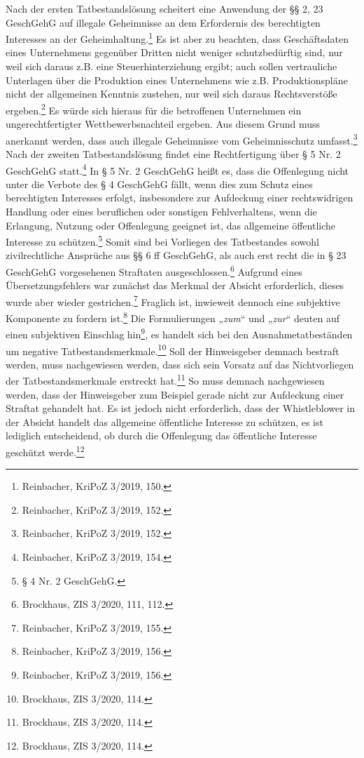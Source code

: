 Nach der ersten Tatbestandslösung scheitert eine Anwendung der §§ 2, 23 GeschGehG auf illegale Geheimnisse an dem Erfordernis des berechtigten Interesses an der Geheimhaltung.\footnote{Reinbacher, KriPoZ 3/2019, 150.}
Es ist aber zu beachten, dass Geschäftsdaten eines Unternehmens gegenüber Dritten nicht weniger schutzbedürftig sind, nur weil sich daraus z.B. eine Steuerhinterziehung ergibt; auch sollen vertrauliche Unterlagen über die Produktion eines Unternehmens wie z.B. Produktionspläne nicht der allgemeinen Kenntnis zustehen, nur weil sich daraus Rechtsverstöße ergeben.\footnote{Reinbacher, KriPoZ 3/2019, 152.}
Es würde sich hieraus für die betroffenen Unternehmen ein ungerechtfertigter Wettbewerbsnachteil ergeben.
Aus diesem Grund muss anerkannt werden, dass auch illegale Geheimnisse vom Geheimnisschutz umfasst.\footnote{Reinbacher, KriPoZ 3/2019, 152.}\\
Nach der zweiten Tatbestandslösung findet eine Rechtfertigung über § 5 Nr. 2 GeschGehG statt.\footnote{Reinbacher, KriPoZ 3/2019, 154.}
In § 5 Nr. 2 GeschGehG heißt es, dass die Offenlegung nicht unter die Verbote des § 4 GeschGehG fällt, wenn dies zum Schutz eines berechtigten Interesses erfolgt, insbesondere zur Aufdeckung einer rechtswidrigen Handlung oder eines beruflichen oder sonstigen Fehlverhaltens, wenn die Erlangung, Nutzung oder Offenlegung geeignet ist, das allgemeine öffentliche Interesse zu schützen.\footnote{§ 4 Nr. 2 GeschGehG.}
Somit sind bei Vorliegen des Tatbestandes sowohl zivilrechtliche Ansprüche aus §§ 6 ff GeschGehG, als auch erst recht die in § 23 GeschGehG vorgesehenen Straftaten ausgeschlossen.\footnote{Brockhaus, ZIS 3/2020, 111, 112.}
Aufgrund eines Übersetzungsfehlers war zunächst das Merkmal der Absicht erforderlich, dieses wurde aber wieder gestrichen.\footnote{Reinbacher, KriPoZ 3/2019, 155.}
Fraglich ist, inwieweit dennoch eine subjektive Komponente zu fordern ist.\footnote{Reinbacher, KriPoZ 3/2019, 156.}
Die Formulierungen „\textit{zum}“ und „\textit{zur}“ deuten auf einen subjektiven Einschlag hin\footnote{Reinbacher, KriPoZ 3/2019, 156.}, es handelt sich bei den Ausnahmetatbeständen um negative Tatbestandsmerkmale.\footnote{Brockhaus, ZIS 3/2020, 114.}
Soll der Hinweisgeber demnach bestraft werden, muss nachgewiesen werden, dass sich sein Vorsatz auf das Nichtvorliegen der Tatbestandsmerkmale erstreckt hat.\footnote{Brockhaus, ZIS 3/2020, 114.}
So muss demnach nachgewiesen werden, dass der Hinweisgeber zum Beispiel gerade nicht zur Aufdeckung einer Straftat gehandelt hat.
Es ist  jedoch nicht erforderlich, dass der Whistleblower in der Absicht handelt das allgemeine öffentliche Interesse zu schützen, es ist lediglich entscheidend, ob durch die Offenlegung das öffentliche Interesse geschützt werde.\footnote{Brockhaus, ZIS 3/2020, 114.} \\
